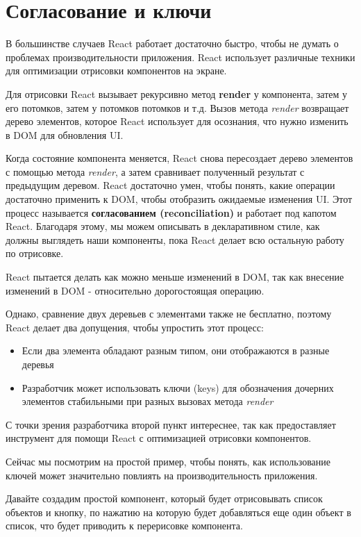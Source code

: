 \section{Согласование и ключи}

В большинстве случаев React работает достаточно быстро, чтобы не думать о проблемах производительности приложения. React использует различные техники для оптимизации отрисовки компонентов на экране.

Для отрисовки React вызывает рекурсивно метод \textbf{render} у компонента, затем у его потомков, затем у потомков потомков и т.д. Вызов метода \textit{render} возвращает дерево элементов, которое React использует для осознания, что нужно изменить в DOM для обновления UI.

Когда состояние компонента меняется, React снова пересоздает дерево элементов с помощью метода \textit{render}, а затем сравнивает полученный результат с предыдущим деревом. React достаточно умен, чтобы понять, какие операции достаточно применить к DOM, чтобы отобразить ожидаемые изменения UI. Этот процесс называется \textbf{согласованием (reconciliation)} и работает под капотом React. Благодаря этому, мы можем описывать в декларативном стиле, как должны выглядеть наши компоненты, пока React делает всю остальную работу по отрисовке.

React пытается делать как можно меньше изменений в DOM, так как внесение изменений в DOM - относительно дорогостоящая операцию.

Однако, сравнение двух деревьев с элементами также не бесплатно, поэтому React делает два допущения, чтобы упростить этот процесс:

\begin{itemize}
	\item Если два элемента обладают разным типом, они отображаются в разные деревья
	\item Разработчик может использовать ключи (keys) для обозначения дочерних элементов стабильными при разных вызовах метода \textit{render}
\end{itemize}  

С точки зрения разработчика второй пункт интереснее, так как предоставляет инструмент для помощи React с оптимизацией отрисовки компонентов.

Сейчас мы посмотрим на простой пример, чтобы понять, как использование ключей может значительно повлиять на производительность приложения.

Давайте создадим простой компонент, который будет отрисовывать список объектов и кнопку, по нажатию на которую будет добавляться еще один объект в список, что будет приводить к перерисовке компонента.

